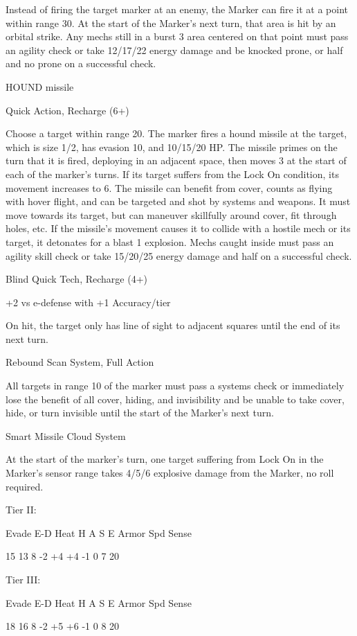 Instead of firing the target marker at an enemy, the Marker can fire it at a point within range 30.
At the start of the Marker’s next turn, that area is hit by an orbital strike. Any mechs still in a burst
3 area centered on that point must pass an agility check or take 12/17/22 energy damage and be
knocked prone, or half and no prone on a successful check.


HOUND missile

Quick Action, Recharge (6+)

Choose a target within range 20. The marker fires a hound missile at the target, which is size 1/2,
has evasion 10, and 10/15/20 HP. The missile primes on the turn that it is fired, deploying in an
adjacent space, then moves 3 at the start of each of the marker’s turns. If its target suffers from
the Lock On condition, its movement increases to 6. The missile can benefit from cover, counts
as flying with hover flight, and can be targeted and shot by systems and weapons. It must move
towards its target, but can maneuver skillfully around cover, fit through holes, etc. If the missile’s
movement causes it to collide with a hostile mech or its target, it detonates for a blast 1
explosion. Mechs caught inside must pass an agility skill check or take 15/20/25 energy damage
and half on a successful check.


Blind
Quick Tech, Recharge (4+)

+2 vs e-defense with +1 Accuracy/tier

On hit, the target only has line of sight to adjacent squares until the end of its next turn.


Rebound Scan
System, Full Action

All targets in range 10 of the marker must pass a systems check or immediately lose the benefit
of all cover, hiding, and invisibility and be unable to take cover, hide, or turn invisible until the
start of the Marker’s next turn.


Smart Missile Cloud
System

At the start of the marker’s turn, one target suffering from Lock On in the Marker’s sensor range
takes 4/5/6 explosive damage from the Marker, no roll required.

Tier II:


          Evade     E-D    Heat    H    A     S     E       Armor        Spd       Sense

          15        13    8        -2   +4    +4    -1      0            7         20

Tier III:

          Evade     E-D    Heat    H    A     S     E       Armor        Spd       Sense

          18        16    8        -2   +5    +6    -1      0            8         20
